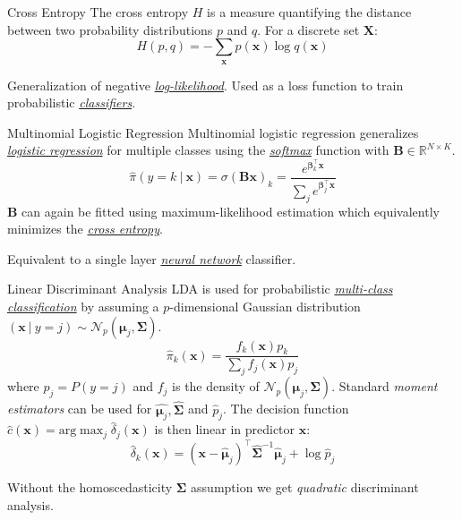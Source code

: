 \documentclass{cognito}
\begin{document}
\begin{note}{Cross Entropy}
	The cross entropy $H$ is a measure quantifying the distance between two probability distributions $p$ and $q$. 
	For a discrete set $\bm X$:
	$$
		H(p, q) = - \sum_{\bm x} p(\bm x) \log q(\bm x)
	$$
	\begin{remark}
		Generalization of negative \hyperref[note:Logistic Regression]{\it log-likelihood}.
		Used as a loss function to train probabilistic \hyperref[note:Supervised Learning]{\it classifiers}.
	\end{remark}
\end{note}

\begin{note}{Multinomial Logistic Regression}
	Multinomial logistic regression generalizes \hyperref[note:Logistic Regression]{\it logistic regression} for multiple classes
	using the \hyperref[note:Softmax Function]{\it softmax} function with $\bm B \in \mathbb{R}^{N \times K}$.
	$$
		\hat \pi(y = k \:\vert\: \bm x) = \sigma(\bm B \bm x)_k = \frac{e^{\bm \beta_k^\intercal \bm x}}{\sum_j e^{\bm \beta_j^\intercal \bm x}}
	$$
	$\bm B$ can again be fitted using maximum-likelihood estimation which equivalently minimizes the \hyperref[note:Cross Entropy]{\it cross entropy}.
	\begin{remark} Equivalent to a single layer \hyperref[note:Artificial Neural Network]{\it neural network} classifier. \end{remark}
	\vspace{-5pt}
\end{note}

\begin{note}{Linear Discriminant Analysis}
	LDA is used for probabilistic \hyperref[note:Supervised Learning]{\it multi-class classification} by
	assuming a $p$-dimensional Gaussian distribution 
	$ ( \bm x \:\vert\: y = j ) \sim \mathcal{N}_p(\bm \mu_j, \bm\Sigma) $.
	$$
		\hat\pi_k(\bm x) = \frac{f_k(\bm x) p_k}{\sum_j f_j(\bm x) p_j}
	$$
	where $p_j = P(y = j)$ and $f_j$ is the density of $\mathcal{N}_p(\bm \mu_j, \bm\Sigma)$.
	Standard \emph{moment estimators} can be used for $\hat{\bm \mu_j}, \hat{\bm\Sigma}$ and $\hat p_j$.
	The decision function $\hat c(\bm x) = \text{arg}\max_j \hat\delta_j(\bm x)$ is then linear in predictor $\bm x$:
	$$
		\hat\delta_k(\bm x) = (\bm x - \hat{\bm \mu}_j)^\intercal \hat{\bm\Sigma}^{-1} \hat{\bm\mu}_j + \log \hat p_j
	$$
	\begin{remark} Without the homoscedasticity $\bm\Sigma$ assumption we get \emph{quadratic} discriminant analysis. \end{remark}
	\vspace{-5pt}
\end{note}
\end{document}
